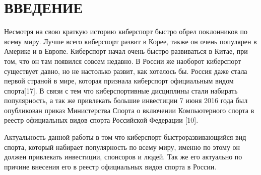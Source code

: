 \chapter*{ВВЕДЕНИЕ}
Несмотря на свою краткую историю киберспорт быстро обрел поклонников по всему миру. Лучше всего киберспорт развит в Корее, также он очень популярен в Америке и в Европе. Киберспорт начал очень быстро развиваться в Китае, при том, что он там появился совсем недавно. В России же наоборот киберспорт существует давно, но не настолько развит, как хотелось бы. Россия даже стала первой страной в мире, которая признала киберспорт официальным видом спорта[17]. В связи с тем что киберспортивные дисциплины стали набирать популярность, а так же привлекать большие инвестиции  7 июня 2016 года был опубликован приказ Министерства Спорта о включении Компьютерного спорта в реестр официальных видов спорта Российской Федерации [10]. \cite{book} \cite{article_levenshtein}

Актуальность данной работы в том что киберспорт быстроразвивающийся вид спорта, который набирает популярность по всему миру, именно по этому он должен привлекать инвестиции, спонсоров и людей. Так же его актуально по причине внесения его в реестр официальных видов спорта в России. \cite{texbook} \cite{latex2e}